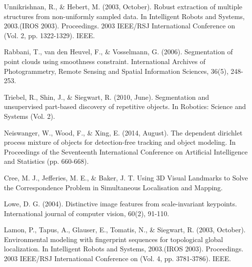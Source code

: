 \documentclass[twoside]{article}
\begin{document}
\begin{multicols}{2}
\begin{thebibliography}{9}
\newblock Unnikrishnan, R., \& Hebert, M. (2003, October). Robust extraction of multiple structures from non-uniformly sampled data. In Intelligent Robots and Systems, 2003.(IROS 2003). Proceedings. 2003 IEEE/RSJ International Conference on (Vol. 2, pp. 1322-1329). IEEE. 

\newblock Rabbani, T., van den Heuvel, F., \& Vosselmann, G. (2006). Segmentation of point clouds using smoothness constraint. International Archives of Photogrammetry, Remote Sensing and Spatial Information Sciences, 36(5), 248-253.

\newblock Triebel, R., Shin, J., \& Siegwart, R. (2010, June). Segmentation and unsupervised part-based discovery of repetitive objects. In Robotics: Science and Systems (Vol. 2).

\newblock Neiswanger, W., Wood, F., \& Xing, E. (2014, August). The dependent dirichlet process mixture of objects for detection-free tracking and object modeling. In Proceedings of the Seventeenth International Conference on Artificial Intelligence and Statistics (pp. 660-668).

\newblock Cree, M. J., Jefferies, M. E., \& Baker, J. T. Using 3D Visual Landmarks to Solve the Correspondence Problem in Simultaneous Localisation and Mapping.

\newblock Lowe, D. G. (2004). Distinctive image features from scale-invariant keypoints. International journal of computer vision, 60(2), 91-110.

\newblock Lamon, P., Tapus, A., Glauser, E., Tomatis, N., \& Siegwart, R. (2003, October). Environmental modeling with fingerprint sequences for topological global localization. In Intelligent Robots and Systems, 2003.(IROS 2003). Proceedings. 2003 IEEE/RSJ International Conference on (Vol. 4, pp. 3781-3786). IEEE.




\end{thebibliography}


\end{multicols}
\end{document}
